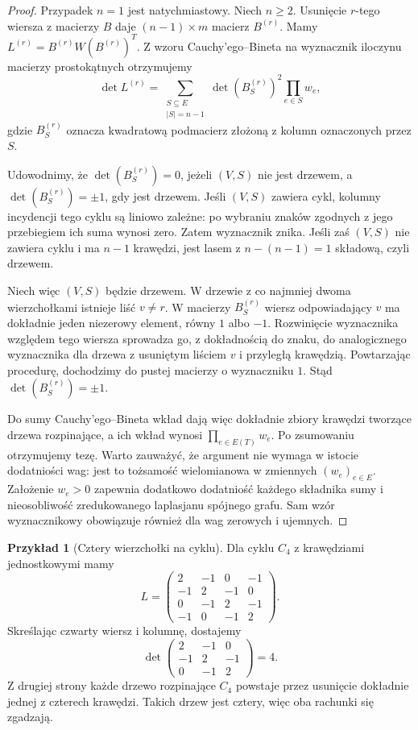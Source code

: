 \documentclass[11pt,a4paper]{report}
\numberwithin{equation}{section}
\theoremstyle{plain}
\theoremstyle{definition}
\newtheorem{przyklad}[twierdzenie]{Przykład}
\theoremstyle{remark}
\begin{document}
\begin{proof}
Przypadek $n=1$ jest natychmiastowy. Niech $n\ge2$.
Usunięcie $r$-tego wiersza z macierzy $B$ daje
$(n-1)\times m$ macierz $B^{(r)}$. Mamy
$L^{(r)}=B^{(r)}W(B^{(r)})^T$.
Z wzoru Cauchy'ego--Bineta na wyznacznik iloczynu
macierzy prostokątnych otrzymujemy
\[
\det L^{(r)}=\sum_{\substack{S\subseteq E\\|S|=n-1}}
  \det(B^{(r)}_S)^2\prod_{e\in S}w_e,
\]
gdzie $B^{(r)}_S$ oznacza kwadratową podmacierz
złożoną z kolumn oznaczonych przez $S$.

Udowodnimy, że $\det(B^{(r)}_S)=0$, jeżeli $(V,S)$
nie jest drzewem, a $\det(B^{(r)}_S)=\pm1$, gdy jest
drzewem. Jeśli $(V,S)$ zawiera cykl, kolumny
incydencji tego cyklu są liniowo zależne: po wybraniu
znaków zgodnych z jego przebiegiem ich suma wynosi zero.
Zatem wyznacznik znika. Jeśli zaś $(V,S)$ nie zawiera
cyklu i ma $n-1$ krawędzi, jest lasem z
$n-(n-1)=1$ składową, czyli drzewem.

Niech więc $(V,S)$ będzie drzewem. W drzewie z co najmniej
dwoma wierzchołkami istnieje liść $v\ne r$.
W macierzy $B^{(r)}_S$ wiersz odpowiadający $v$
ma dokładnie jeden niezerowy element, równy $1$ albo $-1$.
Rozwinięcie wyznacznika względem tego wiersza sprowadza
go, z dokładnością do znaku, do analogicznego wyznacznika
dla drzewa z usuniętym liściem $v$ i przyległą krawędzią.
Powtarzając procedurę, dochodzimy do pustej macierzy
o wyznaczniku $1$. Stąd $\det(B^{(r)}_S)=\pm1$.

Do sumy Cauchy'ego--Bineta wkład dają więc dokładnie
zbiory krawędzi tworzące drzewa rozpinające, a ich
wkład wynosi $\prod_{e\in E(T)}w_e$.
Po zsumowaniu otrzymujemy tezę.
Warto zauważyć, że argument nie wymaga w istocie dodatniości
wag: jest to tożsamość wielomianowa w zmiennych $(w_e)_{e\in E}$.
Założenie $w_e>0$ zapewnia dodatkowo dodatniość każdego
składnika sumy i nieosobliwość zredukowanego laplasjanu
spójnego grafu. Sam wzór wyznacznikowy obowiązuje również
dla wag zerowych i ujemnych.
\end{proof}

\begin{przyklad}[Cztery wierzchołki na cyklu]
Dla cyklu $C_4$ z krawędziami jednostkowymi mamy
\[
L=\begin{pmatrix}
2&-1&0&-1\\-1&2&-1&0\\0&-1&2&-1\\-1&0&-1&2
\end{pmatrix}.
\]
Skreślając czwarty wiersz i kolumnę, dostajemy
\[
\det\begin{pmatrix}2&-1&0\\-1&2&-1\\0&-1&2\end{pmatrix}=4.
\]
Z drugiej strony każde drzewo rozpinające $C_4$
powstaje przez usunięcie dokładnie jednej z czterech
krawędzi. Takich drzew jest cztery, więc oba rachunki
się zgadzają.
\end{przyklad}
\end{document}
